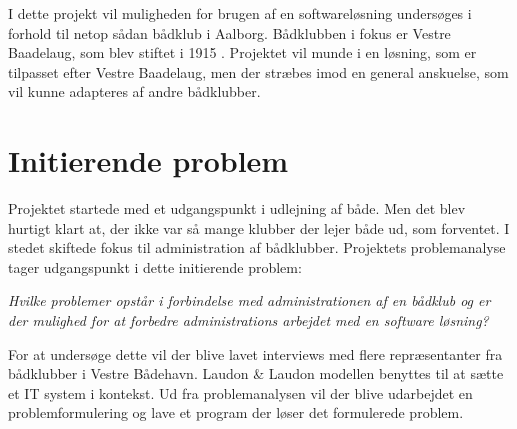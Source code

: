 I dette projekt vil muligheden for brugen af en softwareløsning undersøges i forhold til netop sådan bådklub i Aalborg. Bådklubben i fokus er Vestre Baadelaug, som blev stiftet i 1915 \cite{vb_historie}. Projektet vil munde i en løsning, som er tilpasset efter Vestre Baadelaug, men der stræbes imod en general anskuelse, som vil kunne adapteres af andre bådklubber.


\section{Initierende problem}
\label{initierende}
Projektet startede med et udgangspunkt i udlejning af både. Men det blev hurtigt klart at, der ikke var så mange klubber der lejer både ud, som forventet. I stedet skiftede fokus til administration af bådklubber. Projektets problemanalyse tager udgangspunkt i dette initierende problem:

\textit{Hvilke problemer opstår i forbindelse med administrationen af en bådklub og er der mulighed for at forbedre administrations arbejdet med en software løsning?}

For at undersøge dette vil der blive lavet interviews med flere repræsentanter fra bådklubber i Vestre Bådehavn. Laudon \& Laudon modellen benyttes til at sætte et IT system i kontekst. Ud fra problemanalysen vil der blive udarbejdet en problemformulering og lave et program der løser det formulerede problem.
